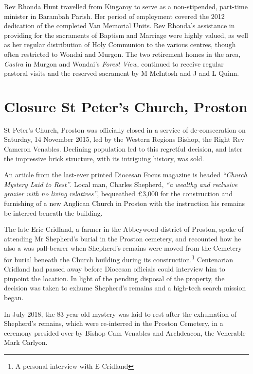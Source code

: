 Rev Rhonda Hunt travelled from Kingaroy to serve as a non-stipended, part-time minister in Barambah Parish. Her period of employment covered the 2012 dedication of the completed Van Memorial Units. Rev Rhonda's assistance in providing for the sacraments of Baptism and Marriage were highly valued, as well as her regular distribution of Holy Communion to the various centres, though often restricted to Wondai and Murgon. The two retirement homes in the area, \emph{Castra} in Murgon and Wondai's \emph{Forest View}, continued to receive regular pastoral visits and the reserved sacrament by M McIntosh and J and L Quinn.



\section{Closure St Peter's Church, Proston}



St Peter's Church, Proston was officially closed in a service of de-consecration on Saturday, 14 November 2015, led by the Western Regions Bishop, the Right Rev Cameron Venables. Declining population led to this regretful decision, and later the impressive brick structure, with its intriguing history, was sold.



An article from the last-ever printed Diocesan Focus magazine is headed \emph{``Church Mystery Laid to Rest''}. Local man, Charles Shepherd, \emph{``a wealthy and reclusive grazier with no living relatives''}, bequeathed \pounds3,000 for the construction and furnishing of a new Anglican Church in Proston with the instruction his remains be interred beneath the building.



The late Eric Cridland, a farmer in the Abbeywood district of Proston, spoke of attending Mr Shepherd's burial in the Proston cemetery, and recounted how he also a was pall-bearer when Shepherd's remains were moved from the Cemetery for burial beneath the Church building during its construction.\footnote{A personal interview with E Cridland} Centenarian Cridland had passed away before Diocesan officials could interview him to pinpoint the location. In light of the pending disposal of the property, the decision was taken to exhume Shepherd's remains and a high-tech search mission began.


In July 2018, the 83-year-old mystery was laid to rest after the exhumation of Shepherd's remains, which were re-interred in the Proston Cemetery, in a ceremony presided over by Bishop Cam Venables and Archdeacon, the Venerable Mark Carlyon.



